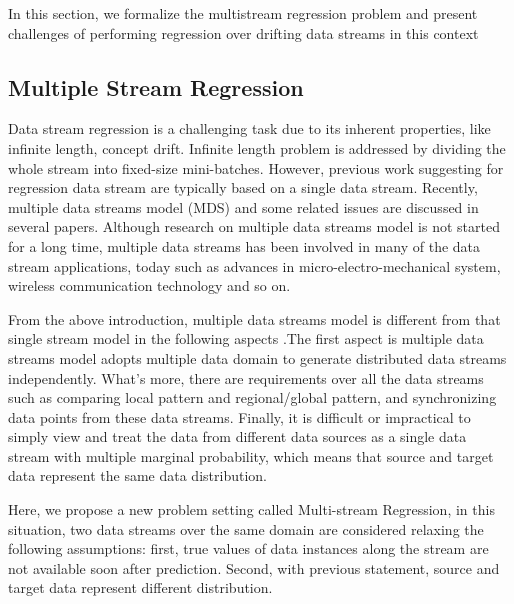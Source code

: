 \documentclass[conference,compsoc]{IEEEtran}
\begin{document}
In this section, we formalize the multistream regression problem and present challenges of performing  regression over drifting data streams in this context

\subsection{Multiple Stream Regression}
\label{statement}

Data stream regression is a challenging task due to its  inherent properties, like infinite length, concept drift. Infinite length problem is addressed by dividing 
the whole stream into fixed-size mini-batches. However, previous  work suggesting for regression  data stream are typically based on a single data stream. Recently, multiple data streams model (MDS) and some related issues are discussed in several papers. Although research on multiple data streams model is not started for a long time, multiple  data  streams  has been involved  in  many of the data stream applications, today such as advances in micro-electro-mechanical system, wireless  communication technology and so on.

  From  the  above introduction,  multiple data streams model is  different  from that  single stream model in the following aspects \cite{bowman:reasoning}.The first aspect is multiple data streams model adopts multiple data domain 
to generate distributed data streams independently. What's more, there are requirements over all  the  data  streams  such as comparing local  pattern and regional/global  pattern,  and synchronizing data points  from  these  data  streams. Finally, it  is difficult  or  impractical  to  simply  view  and  treat  the  data  from different  data  sources  as  a  single  data  stream  with  multiple marginal probability, which means that source and target data 
represent the same data distribution.
  
  Here, we propose a new problem setting called Multi-stream Regression, in this situation, two data streams over the same domain are considered relaxing the following assumptions:  first, true values of data instances along the stream are not available soon after prediction. Second, with previous statement, source and target data represent different distribution.
  
\end{document}
